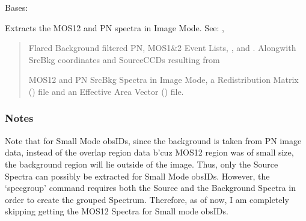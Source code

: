 \documentclass[letterpaper,10pt,english]{sphinxmanual}
\begin{document}
\begin{fulllineitems}
\label{\detokenize{xmmPipeline:xmmPipeline.epicSpectra.epicSpectra}}
\pysigstartsignatures
{}
\pysigstopsignatures
\sphinxAtStartPar
Bases: 

\begin{fulllineitems}
\label{\detokenize{xmmPipeline:xmmPipeline.epicSpectra.epicSpectra.extractSpectra_imageMode}}
\pysigstartsignatures
{}
\pysigstopsignatures
\sphinxAtStartPar
Extracts the MOS12 and PN spectra in Image Mode.
See: ,
\begin{quote}

\sphinxAtStartPar
{}
\end{quote}
\begin{quote}\begin{description}
\sphinxAtStartPar
Flared Background filtered PN, MOS1\&2 Event Lists,
,  and .
Alongwith SrcBkg coordinates and SourceCCDs resulting from 

\sphinxAtStartPar
MOS12 and PN SrcBkg Spectra in Image Mode, a Redistribution Matrix () file and
an Effective Area Vector () file.

\end{description}\end{quote}
\subsubsection*{Notes}

\sphinxAtStartPar
Note that for Small Mode obsIDs, since the background is taken from PN image data,
instead of the overlap region data b’cuz MOS12 region was of small size, the background
region will lie outside of the image. Thus, only the Source Spectra can possibly be
extracted for Small Mode obsIDs. However, the ‘specgroup’ command requires both the
Source and the Background Spectra in order to create the grouped Spectrum. Therefore,
as of now, I am completely skipping getting the MOS12 Spectra for Small mode obsIDs.


\end{fulllineitems}
\end{fulllineitems}
\end{document}
